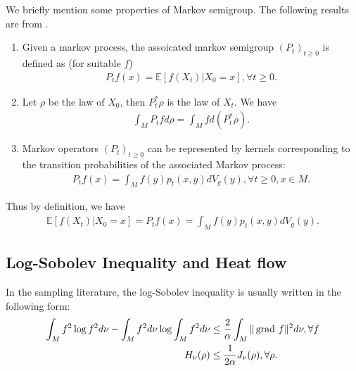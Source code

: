We briefly mention some properties of Markov semigroup.
The following results are from \citet[Section 1.2]{bakry2014analysis}.
\begin{definition}
    \begin{enumerate}
        \item Given a markov process, the assoicated markov semigroup $(P_{t})_{t \ge 0}$ is 
        defined as (for suitable $f$)
        \begin{align*}
            P_{t}f(x)= \mathbb{E}[f(X_{t}) | X_{0} = x], \forall t \ge 0.
        \end{align*}
        \item Let $\rho$ be the law of $X_{0}$, then $P_{t}^{*}\rho$ is the law of $X_{t}$. We have 
        \begin{align*}
            \int_{M} P_{t} f d\rho = \int_{M} f d(P_{t}^{*}\rho).
        \end{align*}
        \item Markov operators $(P_{t})_{t \ge 0}$ can be represented by 
        kernels corresponding to the transition probabilities of the associated 
        Markov process:
        \begin{align*}
            P_{t} f(x) = \int_{M} f(y) p_{t} (x, y) dV_{g}(y), \forall t \ge 0, x \in M.
        \end{align*}
    \end{enumerate}
\end{definition}

Thus by definition, we have
\begin{align*}
    \mathbb{E}[f(X_{t}) | X_{0} = x] = P_{t} f(x) = \int_{M} f(y) p_{t} (x, y) dV_{g}(y).
\end{align*}

\subsection{Log-Sobolev Inequality and Heat flow}\label{LSI_Heat}

In the sampling literature, the log-Sobolev inequality is usually written in the following form: 
\begin{align*}
        \int_{M} f^{2} \log f^{2} d\nu - \int_{M} f^{2} d\nu \log \int_{M} f^{2} d\nu
        &\le \frac{2}{\alpha} \int_{M} \|\operatorname{grad\,} f\|^{2} d\nu , \forall f  \\
        H_{\nu}(\rho) &\le \frac{1}{2\alpha} J_{\nu}(\rho), \forall \rho.
\end{align*}

